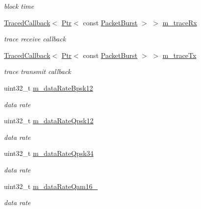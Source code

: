 \begin{DoxyCompactItemize}
\begin{DoxyCompactList}\small\item\em block time \end{DoxyCompactList}\item 
\hyperlink{classns3_1_1TracedCallback}{Traced\+Callback}$<$ \hyperlink{classns3_1_1Ptr}{Ptr}$<$ const \hyperlink{classns3_1_1PacketBurst}{Packet\+Burst} $>$ $>$ \hyperlink{classns3_1_1SimpleOfdmWimaxPhy_af98beb50419576fec304794528811af7}{m\+\_\+trace\+Rx}
\begin{DoxyCompactList}\small\item\em trace receive callback \end{DoxyCompactList}\item 
\hyperlink{classns3_1_1TracedCallback}{Traced\+Callback}$<$ \hyperlink{classns3_1_1Ptr}{Ptr}$<$ const \hyperlink{classns3_1_1PacketBurst}{Packet\+Burst} $>$ $>$ \hyperlink{classns3_1_1SimpleOfdmWimaxPhy_a85b3dfc29714e193dafe64349fb855d7}{m\+\_\+trace\+Tx}
\begin{DoxyCompactList}\small\item\em trace transmit callback \end{DoxyCompactList}\item 
uint32\+\_\+t \hyperlink{classns3_1_1SimpleOfdmWimaxPhy_a6ecf04595f11cd15e531b7a53deaa67c}{m\+\_\+data\+Rate\+Bpsk12}
\begin{DoxyCompactList}\small\item\em data rate \end{DoxyCompactList}\item 
uint32\+\_\+t \hyperlink{classns3_1_1SimpleOfdmWimaxPhy_a0d74c7610520530bd62b43c387e1091f}{m\+\_\+data\+Rate\+Qpsk12}
\begin{DoxyCompactList}\small\item\em data rate \end{DoxyCompactList}\item 
uint32\+\_\+t \hyperlink{classns3_1_1SimpleOfdmWimaxPhy_a49cf99dfb3752745fb7d14348312faac}{m\+\_\+data\+Rate\+Qpsk34}
\begin{DoxyCompactList}\small\item\em data rate \end{DoxyCompactList}\item 
uint32\+\_\+t \hyperlink{classns3_1_1SimpleOfdmWimaxPhy_aa81cd69942160e28ee5df7d324125b70}{m\+\_\+data\+Rate\+Qam16\+\_}
\begin{DoxyCompactList}\small\item\em data rate \end{DoxyCompactList}\item 

\end{DoxyCompactItemize}

